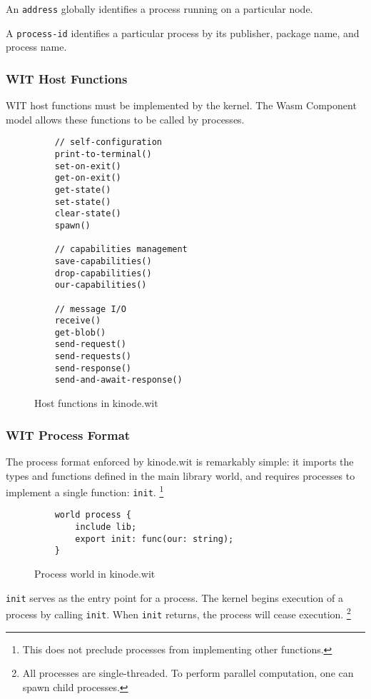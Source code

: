\documentclass[runningheads]{llncs}
\begin{document}
An \verb|address| globally identifies a process running on a particular node.

A \verb|process-id| identifies a particular process by its publisher, package name, and process name.

\subsubsection{WIT Host Functions}
\label{sec:oswitfuncs}

WIT host functions must be implemented by the kernel.
The Wasm Component model allows these functions to be called by processes.

\begin{figure}[H]
    \centering
    \begin{lstlisting}
    // self-configuration
    print-to-terminal()
    set-on-exit()
    get-on-exit()
    get-state()
    set-state()
    clear-state()
    spawn()

    // capabilities management
    save-capabilities()
    drop-capabilities()
    our-capabilities()

    // message I/O
    receive()
    get-blob()
    send-request()
    send-requests()
    send-response()
    send-and-await-response()
    \end{lstlisting}
    \caption{Host functions in kinode.wit}
    \label{fig:WIT Functions}
\end{figure}

\subsubsection{WIT Process Format}
\label{sec:oswitprocess}

The process format enforced by kinode.wit is remarkably simple: it imports the types and functions defined in the main library world, and requires processes to implement a single function: \verb|init|.
\footnote{This does not preclude processes from implementing other functions.}

\begin{figure}[H]
    \centering
    \begin{lstlisting}
    world process {
        include lib;
        export init: func(our: string);
    }
    \end{lstlisting}
    \caption{Process world in kinode.wit}
    \label{fig:Process world}
\end{figure}

\verb|init| serves as the entry point for a process.
The kernel begins execution of a process by calling \verb|init|.
When \verb|init| returns, the process will cease execution.
\footnote{All processes are single-threaded. To perform parallel computation, one can spawn child processes.}
\end{document}

